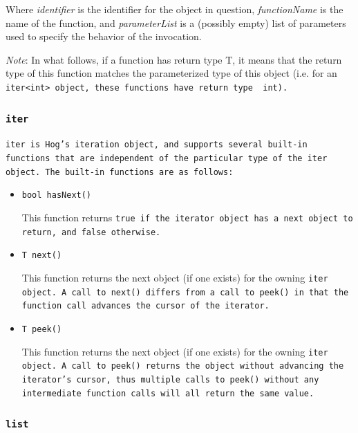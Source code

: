 \documentclass{report}
\begin{document}
\noindent Where \emph{identifier} is the identifier for the object in question,
\emph{functionName} is the name of the function, and \emph{parameterList} is a
(possibly empty) list of parameters used to specify the behavior of the
invocation.

\emph{Note}: In what follows, if a function has return type T, it means that
the return type of this function matches the parameterized type of this object
(i.e. for an \tt iter<int> \rm object, these functions have return type \tt
int\rm).

\subsubsection{\tt iter \rm} %
\label{ssub:iter}

\tt iter \rm is Hog's iteration object, and supports several built-in functions
that are independent of the particular type of the \tt iter \rm object. The
built-in functions are as follows:

\begin{itemize}

\item[] \tt bool hasNext() \rm

This function returns \tt true \rm if the iterator object has a next object
to return, and \tt false \rm otherwise.

\item[] \tt T next() \rm

This function returns the next object (if one exists) for the owning \tt iter \rm
object. A call to \tt next() \rm differs from a call to \tt peek() \rm in that the
function call advances the cursor of the iterator.

\item[] \tt T peek() \rm

This function returns the next object (if one exists) for the owning \tt iter
\rm object. A call to \tt peek() \rm returns the object without advancing the
iterator's cursor, thus multiple calls to \tt peek() \rm without any
intermediate function calls will all return the same value.

\end{itemize} 



\subsubsection{\tt list \rm} %
\label{ssub:list}
\end{document}
